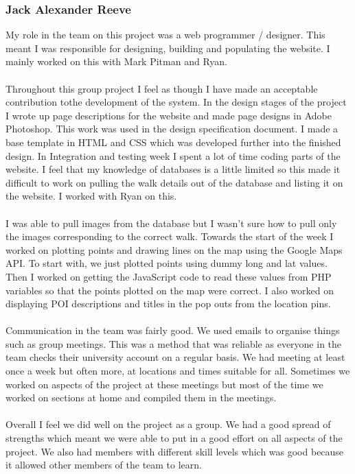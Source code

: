 \documentclass[12pt]{article}
\begin{document}
\subsubsection{Jack Alexander Reeve}
My role in the team on this project was a web programmer / designer. This meant I was responsible for designing, building and populating the website. I mainly worked on this with Mark Pitman and Ryan.
~\\\\
Throughout this group project I feel as though I have made an acceptable contribution tothe development of the system. In the design stages of the project I wrote up page descriptions for the website and made page designs in Adobe Photoshop. This work was used in the design specification document. I made a base template in HTML and CSS which was developed further into the finished design. In Integration and testing week I
spent a lot of time coding parts of the website. I feel that my knowledge of databases is a little limited so this made it difficult to work on pulling the walk details out of the database and listing it on the website. I worked with Ryan on this.
~\\\\
I was able to pull images from the database but I wasn't sure how to pull only the images corresponding to the correct walk. Towards the start of the week I worked on plotting points and drawing lines on the map using the Google Maps API. To start with, we just plotted points using dummy long and lat values. Then I worked on getting the JavaScript code to read these values from PHP variables so that the points plotted on the map were correct. I also worked on displaying POI descriptions and titles in the pop outs from the location pins.
~\\\\
Communication in the team was fairly good. We used emails to organise things such as group meetings. This was a method that was reliable as everyone in the team checks their university account on a regular basis. We had meeting at least once a week but often more, at locations and times suitable for all. Sometimes we worked on aspects of the project at these meetings but most of the time we worked on sections at home and
compiled them in the meetings.
~\\\\
Overall I feel we did well on the project as a group. We had a good spread of strengths which meant we were able to put in a good effort on all aspects of the project. We also had members with different skill levels which was good because it allowed other members of the team to learn.
\end{document}
